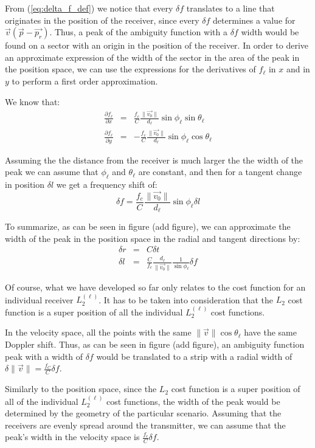 From (\ref{eq:delta_f_def}) we notice that every $\delta f$ translates to a line that originates in the position of the receiver, since every $\delta f$ determines a value for $\vec{v} (\vec{p}-\vec{p_r})$.
Thus, a peak of the ambiguity function with a $\delta f$ width would be found on a sector with an origin in the position of the receiver.
In order to derive an approximate expression of the width of the sector in the area of the peak in the position space, we can use the expressions for the derivatives of $f_\ell$ in $x$ and in $y$ to perform a first order approximation.

We know that:
\begin{eqnarray}
\frac{\partial f_\ell}{\partial x} &=& \frac{f_c}{C} \frac{\|\vec{v_0}\|}{d_\ell} \sin \phi_\ell\sin \theta_\ell \nonumber \\
\frac{\partial f_\ell}{\partial y} &=& -\frac{f_c}{C} \frac{\|\vec{v_0}\|}{d_\ell} \sin \phi_\ell \cos \theta_\ell  \nonumber
\end{eqnarray}

Assuming the the distance from the receiver is much larger the the width of the peak we can assume that $\phi_\ell$ and $\theta_\ell$ are constant, and then for a tangent change in position $\delta l$ we get a frequency shift of:
\begin{equation}
\delta f = \frac{f_c}{C} \frac{\|\vec{v_0}\|}{d_\ell} \sin\phi_\ell \delta l
\end{equation}

To summarize, as can be seen in figure (add figure), we can approximate the width of the peak in the position space in the radial and tangent directions by:
\begin{eqnarray}
\delta r &=& C \delta t \nonumber \\
\delta l &=& \frac{C}{f_c} \frac{d_\ell}{\|\vec{v_0}\|}\frac{1}{\sin \phi_\ell} \delta f \nonumber
\end{eqnarray}

Of course, what we have developed so far only relates to the cost function for an individual receiver $L_2^{(\ell)}$. It has to be taken into consideration that the $L_2$ cost function is a super position of all the individual $L_2^{(\ell)}$ cost functions.

In the velocity space, all the points with the same $\|\vec{v}\| \cos \theta_\ell$ have the same Doppler shift. Thus, as can be seen in figure (add figure), an ambiguity function peak with a width of $\delta f$ would be translated to a strip with a radial width of $\delta \|\vec{v}\| = \frac{f_C}{C}\delta f$.

Similarly to the position space, since the $L_2$ cost function is a super position of all of the individual $L_2^{(\ell)}$ cost functions, the width of the peak would be determined by the geometry of the particular scenario. Assuming that the receivers are evenly spread around the transmitter, we can assume that the peak's width in the velocity space is $\frac{f_c}{C}\delta f$.
